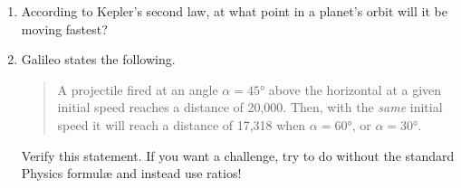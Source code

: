 \begin{exercises}{}{}
\begin{enumerate}
	  
	  \item%
	  According to Kepler's second law, at what point in a planet's orbit will it be moving fastest?
	  
	  
	  \item%
	  Galileo states the following.
	  \begin{quote}
	  	A projectile fired at an angle $\alpha=\ang{45}$ above the horizontal at a given initial speed reaches a distance of 20,000. Then, with the \emph{same} initial speed it will reach a distance of 17,318 when $\alpha=\ang{60}$, or $\alpha=\ang{30}$.
	  \end{quote}
	  Verify this statement. If you want a challenge, try to do without the standard Physics formulæ and instead use ratios!
	\end{enumerate}
\end{exercises}

